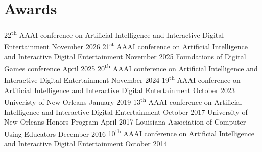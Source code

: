 \documentclass{cv}
\begin{document}
\section*{Awards}
	{22\textsuperscript{th} AAAI conference on Artificial Intelligence and Interactive Digital Entertainment}
	{November 2026}
	{21\textsuperscript{st} AAAI conference on Artificial Intelligence and Interactive Digital Entertainment}
	{November 2025}
	{Foundations of Digital Games conference}
	{April 2025}
	{20\textsuperscript{th} AAAI conference on Artificial Intelligence and Interactive Digital Entertainment}
	{November 2024}
	{19\textsuperscript{th} AAAI conference on Artificial Intelligence and Interactive Digital Entertainment}
	{October 2023}
	{Univeristy of New Orleans}
	{January 2019}
	{13\textsuperscript{th} AAAI conference on Artificial Intelligence and Interactive Digital Entertainment}
	{October 2017}
	{University of New Orleans Honors Program}
	{April 2017}
	{Louisiana Association of Computer Using Educators}
	{December 2016}
	{10\textsuperscript{th} AAAI conference on Artificial Intelligence and Interactive Digital Entertainment}
	{October 2014}
\end{document}
